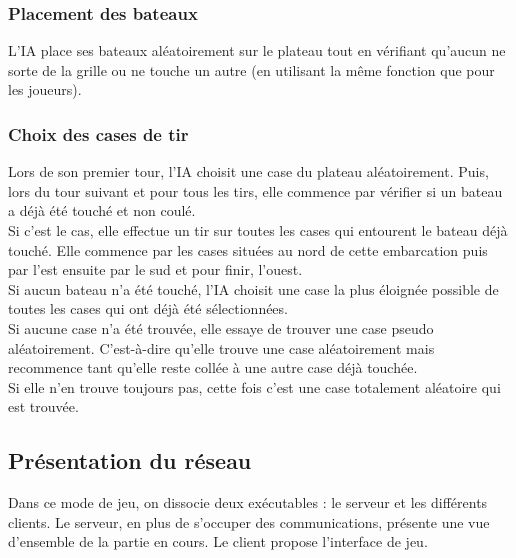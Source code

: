 \documentclass[a4paper,12pt]{article}
\begin{document}
\subsubsection {Placement des bateaux}
    L'IA place ses bateaux aléatoirement sur le plateau tout en vérifiant qu'aucun ne sorte de la grille ou ne touche un autre (en utilisant la même fonction que pour les joueurs).
\subsubsection {Choix des cases de tir}

    Lors de son premier tour, l'IA choisit une case du plateau aléatoirement. Puis, lors du tour suivant et pour tous les tirs, elle commence par vérifier si un bateau a déjà été touché et non coulé. \\
    Si c'est le cas, elle effectue un tir sur toutes les cases qui entourent le bateau déjà touché. Elle commence par les cases situées au nord de cette embarcation puis par l'est ensuite par le sud et pour finir, l'ouest. \\
    
    Si aucun bateau n'a été touché, l'IA choisit une case la plus éloignée possible de toutes les cases qui ont déjà été sélectionnées.\\
    Si aucune case n'a été trouvée, elle essaye de trouver une case pseudo aléatoirement. C'est-à-dire qu'elle trouve une case aléatoirement mais recommence tant qu'elle reste collée à une autre case déjà touchée.\\
    Si elle n'en trouve toujours pas, cette fois c'est une case totalement aléatoire qui est trouvée.
\newpage
\subsection {Présentation du réseau}
Dans ce mode de jeu, on dissocie deux exécutables : le serveur et les différents clients.
Le serveur, en plus de s'occuper des communications, présente une vue d'ensemble de la partie en cours. Le client propose l'interface de jeu.
\end{document}
